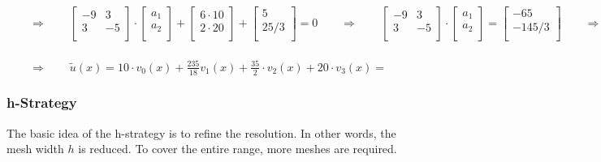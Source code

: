 $\qquad\Rightarrow\qquad
\begin{bmatrix}
	-9 & 3\\
	3 & -5\\
\end{bmatrix}\cdot
\begin{bmatrix}
	a_1\\
	a_2\\
\end{bmatrix}+
\begin{bmatrix}
	6\cdot 10\\
	2\cdot 20\\
\end{bmatrix}+
\begin{bmatrix}
	5\\
	25/3\\
\end{bmatrix}
=0\qquad\Rightarrow\qquad
\begin{bmatrix}
	-9 & 3\\
	3 & -5\\
\end{bmatrix}\cdot
\begin{bmatrix}
	a_1\\
	a_2\\
\end{bmatrix}=
\begin{bmatrix}
	-65\\
	-145/3\\
\end{bmatrix}\qquad\Rightarrow\qquad
\begin{bmatrix}
	a_1\\
	a_2\\
\end{bmatrix}=
\begin{bmatrix}
	235/18\\
	35/2\\
\end{bmatrix}
$\\
\\
$
\qquad\Rightarrow\qquad \tilde{u}(x)=10\cdot v_0(x)+\frac{235}{18} v_1(x)+\frac{35}{2}\cdot v_2(x)+20\cdot v_3(x)=
$




\subsubsection{h-Strategy}

The basic idea of the h-strategy is to refine the resolution. In other words,
the mesh width $h$ is reduced. To cover the entire range, more meshes are required.

